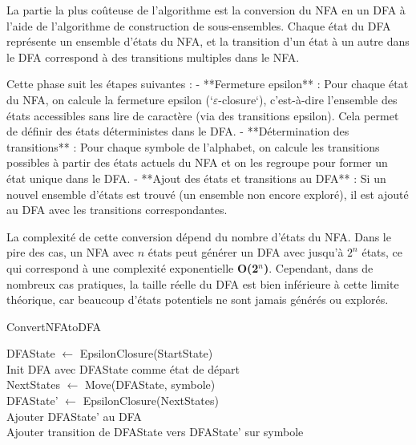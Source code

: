 \documentclass[11pt,english]{article}
\begin{document}
La partie la plus coûteuse de l'algorithme est la conversion du NFA en un DFA à l'aide de l'algorithme de construction de sous-ensembles. Chaque état du DFA représente un ensemble d'états du NFA, et la transition d'un état à un autre dans le DFA correspond à des transitions multiples dans le NFA.

Cette phase suit les étapes suivantes :
- **Fermeture epsilon** : Pour chaque état du NFA, on calcule la fermeture epsilon (`$\varepsilon $-closure`), c'est-à-dire l'ensemble des états accessibles sans lire de caractère (via des transitions epsilon). Cela permet de définir des états déterministes dans le DFA.
- **Détermination des transitions** : Pour chaque symbole de l'alphabet, on calcule les transitions possibles à partir des états actuels du NFA et on les regroupe pour former un état unique dans le DFA.
- **Ajout des états et transitions au DFA** : Si un nouvel ensemble d'états est trouvé (un ensemble non encore exploré), il est ajouté au DFA avec les transitions correspondantes.

La complexité de cette conversion dépend du nombre d'états du NFA. Dans le pire des cas, un NFA avec $n$ états peut générer un DFA avec jusqu'à $2^n$ états, ce qui correspond à une complexité exponentielle \textbf{O(2$^n$)}. Cependant, dans de nombreux cas pratiques, la taille réelle du DFA est bien inférieure à cette limite théorique, car beaucoup d'états potentiels ne sont jamais générés ou explorés.

\begin{algorithm}[htbp]
    \SetAlFnt{\footnotesize\sf}

    \caption{ConvertNFAtoDFA}
    
    \Begin
    {
        DFAState $\leftarrow$ EpsilonClosure(StartState) \\
        Init DFA avec DFAState comme état de départ \\
        
        {
            {
                NextStates $\leftarrow$ Move(DFAState, symbole) \\
                DFAState' $\leftarrow$ EpsilonClosure(NextStates) \\
                
                {
                    Ajouter DFAState' au DFA \\
                }
                Ajouter transition de DFAState vers DFAState' sur symbole \\
            }
        }
    }
\end{algorithm}
\end{document}
